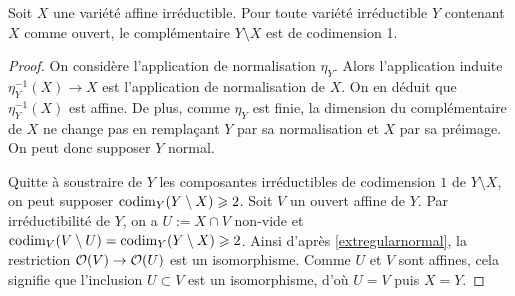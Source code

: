 \begin{prop}\label{codimaffinenormal}
Soit $X$ une variété affine irréductible. Pour toute variété irréductible $Y$ contenant $X$ comme ouvert, le complémentaire $Y\setminus X$ est de codimension 1.
\end{prop}
\begin{proof}
On considère l'application de normalisation $\eta_Y$. Alors l'application induite $\eta_Y^{-1}(X)\rightarrow X$ est l'application de normalisation de $X$. On en déduit que $\eta_Y^{-1}(X)$ est affine. De plus, comme $\eta_Y$ est finie, la dimension du complémentaire de $X$ ne change pas en remplaçant $Y$ par sa normalisation et $X$ par sa préimage. On peut donc supposer $Y$ normal.

Quitte à soustraire de $Y$ les composantes irréductibles de codimension $1$ de $Y\setminus X$, on peut supposer $\operatorname{codim}_Y(Y\setminus X)\geqslant 2$. Soit $V$ un ouvert affine de $Y$. Par irréductibilité de $Y$, on a $U:=X\cap V$ non-vide et $\operatorname{codim}_V(V\setminus U)=\operatorname{codim}_Y(Y\setminus X)\geqslant 2$. Ainsi d'après \ref{extregularnormal}, la restriction $\mathcal{O}(V)\rightarrow \mathcal{O}(U)$ est un isomorphisme. Comme $U$ et $V$ sont affines, cela signifie que l'inclusion $U\subset V$ est un isomorphisme, d'où $U=V$ puis $X=Y$.
\end{proof}


